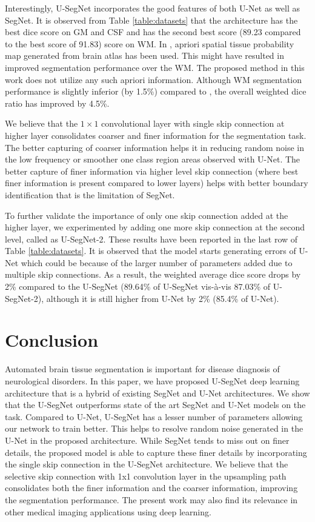 \documentclass{article}
\begin{document}
Interestingly, U-SegNet incorporates the good features of both U-Net as well as SegNet. It is observed from Table \ref{table:datasets} that the architecture has the best dice score on GM and CSF and has the second best score (89.23 compared to the best score of 91.83) score on WM. In \cite{1}, apriori spatial tissue probability map generated from brain atlas has been used. This might have resulted in improved segmentation performance over the WM. The proposed method in this work does not utilize any such apriori information. Although WM segmentation performance is slightly inferior (by 1.5\%) compared to \cite{1}, the overall weighted dice ratio has  improved by 4.5\%.

We believe that the $1\times1$ convolutional layer with single skip connection at higher layer consolidates coarser and finer information for the segmentation task. The better capturing of coarser information helps it in reducing random noise in the low frequency or smoother one class region areas observed with U-Net. The better capture of finer information via higher level skip connection (where best finer information is present compared to lower layers) helps with better boundary identification that is the limitation of SegNet.

To further validate the importance of only one skip connection added at the higher layer, we experimented by adding one more skip connection at the second level, called as U-SegNet-2. These results have been reported in the last row of Table \ref{table:datasets}. It is observed that the model starts generating errors of U-Net which could be because of the larger number of parameters added due to multiple skip connections. As a result, the weighted average dice score drops by 2\% compared to the U-SegNet (89.64\% of U-SegNet vis-\`a-vis 87.03\% of U-SegNet-2), although it is still higher from U-Net by 2\% (85.4\% of U-Net).

\section{Conclusion}

Automated brain tissue segmentation is important for disease diagnosis of neurological disorders. In this paper, we have proposed U-SegNet deep learning architecture that is a hybrid of existing SegNet and U-Net architectures. We show that the U-SegNet outperforms state of the art SegNet and U-Net models on the task. Compared to U-Net, U-SegNet has a lesser number of parameters allowing our network to train better. This helps to resolve random noise generated in the U-Net in the proposed architecture. While SegNet tends to miss out on finer details, the proposed model is able to capture these finer details by incorporating the single skip connection in the U-SegNet architecture. We believe that the selective skip connection with 1x1 convolution layer in the upsampling path consolidates both the finer information and the coarser information, improving the segmentation performance. The present work may also find its relevance in other medical imaging applications using deep learning.
\end{document}
